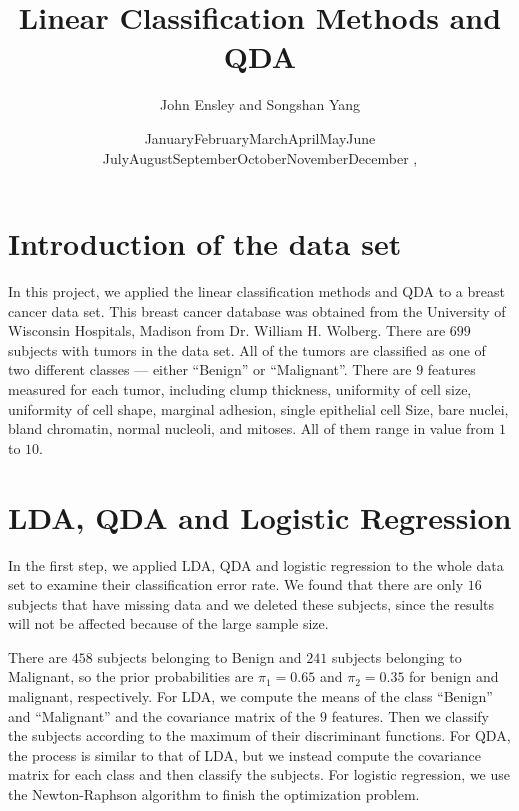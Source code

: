 \documentclass[12pt]{article}
\def\today{\ifcase\month\or
  January\or February\or March\or April\or May\or June\or
  July\or August\or September\or October\or November\or December\fi
  \space\number\day, \number\year}
\begin{document}
\renewcommand{\baselinestretch}{1.5}

\title{Linear Classification Methods and QDA}

\author{\sc John Ensley and Songshan Yang}

\date{\today}
\maketitle
\section{Introduction of the data set}

In this project, we applied the linear classification methods and QDA to a breast cancer data set. This breast cancer database was obtained from the University of Wisconsin Hospitals, Madison from Dr. William H. Wolberg.
There are $699$ subjects with tumors in the data set. All of the tumors are classified as one of two different classes --- either ``Benign'' or ``Malignant''. There are $9$ features measured for each tumor, including clump thickness, uniformity of cell size, uniformity of cell shape, marginal adhesion, single epithelial cell Size, bare nuclei, bland chromatin, normal nucleoli, and mitoses. All of them range in value from $1$ to $10$.



\section{LDA, QDA and Logistic Regression}
In the first step, we applied LDA, QDA and logistic regression to the whole data set to examine their classification error rate. We found that there are only $16$ subjects that have missing data and we deleted these subjects, since the results will not be affected because of the large sample size. 

There are $458$ subjects belonging to Benign and $241$ subjects belonging to Malignant, so the prior probabilities are $\pi_1=0.65$ and $\pi_2=0.35$ for benign and malignant, respectively. For LDA, we compute the means of the class ``Benign'' and ``Malignant'' and the covariance matrix of the $9$ features. Then we classify the subjects according to the maximum of their discriminant functions. For QDA, the process is similar to that of LDA, but we instead compute the covariance matrix for each class and then classify the subjects. For logistic regression, we use the Newton-Raphson algorithm to finish the optimization problem.   
\end{document}
